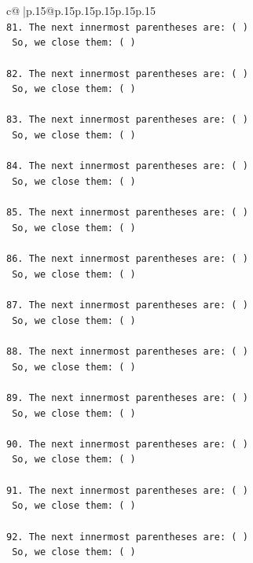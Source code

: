 \documentclass{article}
\begin{document}
{\begin{supertabular}{c@{$\;$}|p{.15\linewidth}@{}p{.15\linewidth}p{.15\linewidth}p{.15\linewidth}p{.15\linewidth}p{.15\linewidth}}
{{{\\ 
\texttt{81. The next innermost parentheses are: ( ) } \\
\texttt{    So, we close them: ( ) } \\
\\ 
\texttt{82. The next innermost parentheses are: ( ) } \\
\texttt{    So, we close them: ( ) } \\
\\ 
\texttt{83. The next innermost parentheses are: ( ) } \\
\texttt{    So, we close them: ( ) } \\
\\ 
\texttt{84. The next innermost parentheses are: ( ) } \\
\texttt{    So, we close them: ( ) } \\
\\ 
\texttt{85. The next innermost parentheses are: ( ) } \\
\texttt{    So, we close them: ( ) } \\
\\ 
\texttt{86. The next innermost parentheses are: ( ) } \\
\texttt{    So, we close them: ( ) } \\
\\ 
\texttt{87. The next innermost parentheses are: ( ) } \\
\texttt{    So, we close them: ( ) } \\
\\ 
\texttt{88. The next innermost parentheses are: ( ) } \\
\texttt{    So, we close them: ( ) } \\
\\ 
\texttt{89. The next innermost parentheses are: ( ) } \\
\texttt{    So, we close them: ( ) } \\
\\ 
\texttt{90. The next innermost parentheses are: ( ) } \\
\texttt{    So, we close them: ( ) } \\
\\ 
\texttt{91. The next innermost parentheses are: ( ) } \\
\texttt{    So, we close them: ( ) } \\
\\ 
\texttt{92. The next innermost parentheses are: ( ) } \\
\texttt{    So, we close them: ( ) } \\
}}}
\end{supertabular}}
\end{document}
